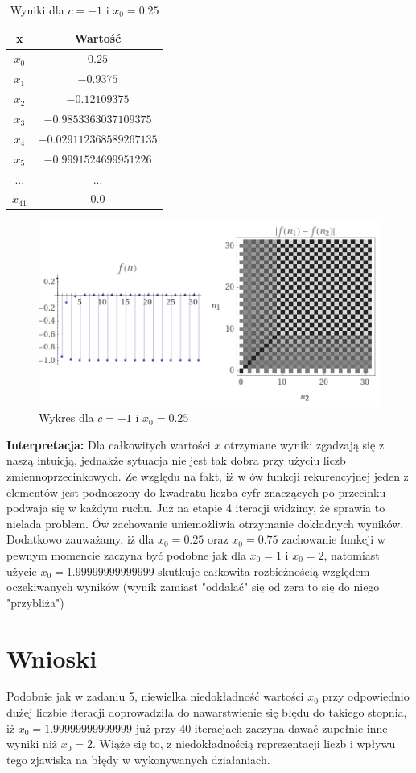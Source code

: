 \documentclass[a4paper,14pt]{report}
\begin{document}
    \begin{table}[H]
    \centering
    \begin{tabular}{|c | c |} 
     \hline
     x & Wartość \\ [0.5ex]
     \hline\hline
     $x_{0}$ & $0.25$ \\
     $x_{1}$ & $-0.9375$ \\
     $x_{2}$ & $-0.12109375$ \\
     $x_{3}$ & $-0.9853363037109375$ \\
     $x_{4}$ & $-0.029112368589267135$  \\
     $x_{5}$ & $-0.9991524699951226$ \\
     ... & ... \\
     $x_{41}$ & $0.0 $ \\
     \hline
    \end{tabular}
    \caption{Wyniki dla $c=-1$ i $x_{0}=0.25$}
    \label{Zad6g}
    \end{table}
    \begin{figure}[H]
      \includegraphics[scale=1.0]{wykresZad6g}
      \centering
      \caption{Wykres dla $c=-1$ i $x_{0}=0.25$}
    \end{figure}
    \textbf{Interpretacja: } Dla całkowitych wartości $x$ otrzymane wyniki zgadzają się z naszą intuicją, jednakże sytuacja nie jest tak dobra przy użyciu liczb zmiennoprzecinkowych. Ze względu na fakt, iż w ów funkcji rekurencyjnej jeden z elementów jest podnoszony do kwadratu liczba cyfr znaczących po przecinku podwaja się w każdym ruchu. Już na etapie 4 iteracji widzimy, że sprawia to nielada problem. Ów zachowanie uniemożliwia otrzymanie dokładnych wyników. \\
    Dodatkowo zauważamy, iż dla $x_{0}=0.25$ oraz $x_{0}=0.75$ zachowanie funkcji w pewnym momencie zaczyna być podobne jak dla $x_{0}=1$ i $x_{0}=2$, natomiast użycie $x_{0}=1.99999999999999$ skutkuje całkowita rozbieżnością względem oczekiwanych wyników (wynik zamiast "oddalać" się od zera to się do niego "przybliża")
  \section{Wnioski}
    Podobnie jak w zadaniu 5, niewielka niedokładność wartości $x_{0}$ przy odpowiednio dużej liczbie iteracji doprowadziła do nawarstwienie się błędu do takiego stopnia, iż $x_{0}=1.99999999999999$ już przy 40 iteracjach zaczyna dawać zupełnie inne wyniki niż $x_{0}=2$. Wiąże się to, z niedokładnością reprezentacji liczb i wpływu tego zjawiska na błędy w wykonywanych działaniach.
\end{document}
